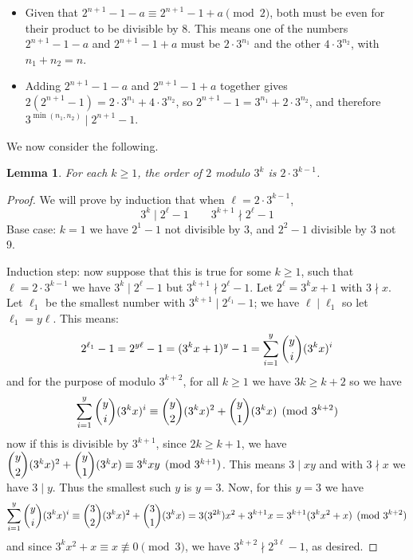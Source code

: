 \documentclass[11pt]{article}
\newcommand{\<}{\langle}
\renewcommand{\>}{\rangle}
\newtheorem{lemma}{Lemma}
\begin{document}
\begin{enumerate}
	\begin{itemize}
		\item Given that $2^{n+1}-1-a\equiv 2^{n+1}-1+a\pmod{2}$, both must be even for their product to be divisible by 8. This means one of the numbers $2^{n+1}-1-a$ and $2^{n+1}-1+a$ must be $2\cdot 3^{n_1}$ and the other $4\cdot 3^{n_2}$, with $n_1+n_2=n$. 
		
		\item Adding $2^{n+1}-1-a$ and $2^{n+1}-1+a$ together gives $2(2^{n+1}-1)=2\cdot 3^{n_1}+4\cdot 3^{n_2}$, so $2^{n+1}-1= 3^{n_1}+2\cdot 3^{n_2}$, and therefore $3^{\min(n_1, n_2)}\mid 2^{n+1}-1$. 
	\end{itemize}
	
	We now consider the following.
	\begin{lemma}
		For each $k\ge 1$, the order of $2$ modulo $3^k$ is $2\cdot 3^{k-1}$.
	\end{lemma}
    
    \begin{proof}
    	We will prove by induction that when $\ell = 2\cdot 3^{k-1}$, 
    	\begin{equation}
    		  3^k\mid 2^{\ell}-1\qquad 3^{k+1}\nmid 2^{\ell}-1
    	\end{equation}
    	Base case: $k=1$ we have $2^1-1$ not divisible by 3, and $2^2-1$ divisible by 3 not 9. 
    	
    	Induction step: 
    	now suppose that this is true for some $k\ge 1$, such that $\ell=2\cdot 3^{k-1}$ we have $3^k\mid 2^{\ell}-1$ but $3^{k+1}\nmid 2^{\ell}-1$. Let $2^{\ell}=3^kx+1$ with $3\nmid x$. Let $\ell_1$ be the smallest number with $3^{k+1}\mid 2^{\ell_1}-1$; we have $\ell\mid \ell_1$ so let $\ell_1=y\ell$. This means: 
    	\[
    	2^{\ell_1}-1 = 2^{y\ell}-1=(3^kx+1)^y-1 = \displaystyle\sum_{i=1}^y \dbinom{y}{i}(3^kx)^i
    	\]
    	and for the purpose of modulo $3^{k+2}$, for all $k\ge 1$ we have $3k\ge k+2$ so we have 
    	\[
    	\displaystyle\sum_{i=1}^y \dbinom{y}{i}(3^kx)^i\equiv 
    	\dbinom{y}{2}(3^kx)^2 + \dbinom{y}{1}(3^kx)
    	\pmod{3^{k+2}}
    	\]
    	now if this is divisible by $3^{k+1}$, since $2k\ge k+1$, we have $\dbinom{y}{2}(3^kx)^2 + \dbinom{y}{1}(3^kx)\equiv 3^kxy\pmod{3^{k+1}}$. This means $3\mid xy$ and with $3\nmid x$ we have $3\mid y$. Thus the smallest such $y$ is $y=3$. Now, for this $y=3$ we have 
    	\[
    	\displaystyle\sum_{i=1}^y \dbinom{y}{i}(3^kx)^i\equiv 
    	\dbinom{3}{2}(3^kx)^2 + \dbinom{3}{1}(3^kx)
    	=3(3^{2k})x^2+3^{k+1}x
    	=3^{k+1}(3^kx^2+x)
    	\pmod{3^{k+2}}
    	\]
    	and since $3^kx^2+x\equiv x\not\equiv 0\pmod{3}$, we have $3^{k+2}\nmid 2^{3\ell}-1$, as desired. 
    \end{proof}
	

\end{enumerate}
\end{document}
